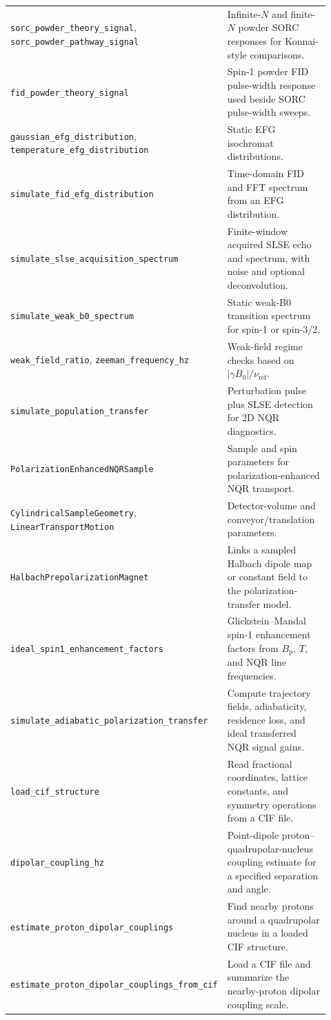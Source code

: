\documentclass[11pt,oneside]{report}
\newcommand{\code}[1]{\texttt{#1}}
\begin{document}
\begin{longtable}{p{0.42\linewidth}p{0.50\linewidth}}
\code{sorc\_powder\_theory\_signal}, \code{sorc\_powder\_pathway\_signal} & Infinite-\(N\) and finite-\(N\) powder SORC responses for Konnai-style comparisons. \\
\code{fid\_powder\_theory\_signal} & Spin-1 powder FID pulse-width response used beside SORC pulse-width sweeps. \\
\code{gaussian\_efg\_distribution}, \code{temperature\_efg\_distribution} & Static EFG isochromat distributions. \\
\code{simulate\_fid\_efg\_distribution} & Time-domain FID and FFT spectrum from an EFG distribution. \\
\code{simulate\_slse\_acquisition\_spectrum} & Finite-window acquired SLSE echo and spectrum, with noise and optional deconvolution. \\
\code{simulate\_weak\_b0\_spectrum} & Static weak-B0 transition spectrum for spin-1 or spin-3/2. \\
\code{weak\_field\_ratio}, \code{zeeman\_frequency\_hz} & Weak-field regime checks based on \(|\gamma B_0|/\nu_{\mathrm{ref}}\). \\
\code{simulate\_population\_transfer} & Perturbation pulse plus SLSE detection for 2D NQR diagnostics. \\
\code{PolarizationEnhancedNQRSample} & Sample and spin parameters for polarization-enhanced NQR transport. \\
\code{CylindricalSampleGeometry}, \code{LinearTransportMotion} & Detector-volume and conveyor/translation parameters. \\
\code{HalbachPrepolarizationMagnet} & Links a sampled Halbach dipole map or constant field to the polarization-transfer model. \\
\code{ideal\_spin1\_enhancement\_factors} & Glickstein--Mandal spin-1 enhancement factors from \(B_{\mathrm{p}}\), \(T\), and NQR line frequencies. \\
\code{simulate\_adiabatic\_\allowbreak polarization\_\allowbreak transfer} & Compute trajectory fields, adiabaticity, residence loss, and ideal transferred NQR signal gains. \\
\code{load\_cif\_structure} & Read fractional coordinates, lattice constants, and symmetry operations from a CIF file. \\
\code{dipolar\_coupling\_hz} & Point-dipole proton--quadrupolar-nucleus coupling estimate for a specified separation and angle. \\
\code{estimate\_proton\_dipolar\_couplings} & Find nearby protons around a quadrupolar nucleus in a loaded CIF structure. \\
\code{estimate\_proton\_dipolar\_\allowbreak couplings\_\allowbreak from\_cif} & Load a CIF file and summarize the nearby-proton dipolar coupling scale. \\
\bottomrule
\end{longtable}
\end{document}
